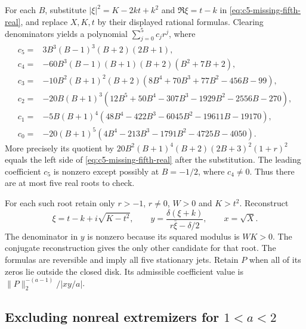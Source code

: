 \documentclass[11pt]{article}
\begin{document}
For each \(B\), substitute \(|\xi|^2=K-2kt+k^2\) and
\(\Re\xi=t-k\) in \eqref{eq:c5-missing-fifth-real}, and replace
\(X,K,t\) by their displayed rational formulas. Clearing
denominators yields a polynomial \(\sum_{j=0}^5 c_jr^j\),
where
\begin{align*}
 c_5={}&3B^3(B-1)^3(B+2)(2B+1),\\
 c_4={}&-60B^3(B-1)(B+1)(B+2)(B^2+7B+2),\\
 c_3={}&-10B^2(B+1)^2(B+2)(8B^4+70B^3+77B^2-456B-99),\\
 c_2={}&-20B(B+1)^3(12B^5+50B^4-307B^3-1929B^2-2556B-270),\\
 c_1={}&-5B(B+1)^4(48B^4-422B^3-6045B^2-19611B-19170),\\
 c_0={}&-20(B+1)^5(4B^4-213B^3-1791B^2-4725B-4050).
\end{align*}
More precisely its quotient by
\(20B^2(B+1)^4(B+2)(2B+3)^2(1+r)^2\) equals the left side of
\eqref{eq:c5-missing-fifth-real} after the substitution.
The leading coefficient \(c_5\) is nonzero except possibly
at \(B=-1/2\), where \(c_4\ne0\). Thus there are at most
five real roots to check.

For each such root retain only \(r>-1\), \(r\ne0\), \(W>0\)
and \(K>t^2\). Reconstruct
\[
 \xi=t-k+i\sqrt{K-t^2},\qquad
 y=\frac{\delta(\xi+k)}{r\bar\xi-\delta/2},\qquad x=\sqrt X.
\]
The denominator in \(y\) is nonzero because its squared modulus
is \(WK>0\). The conjugate reconstruction gives the only other
candidate for that root. The formulas are reversible and imply
all five stationary jets. Retain \(P\) when all of its zeros
lie outside the closed disk. Its admissible coefficient value is
\(\|P\|_2^{-(a-1)}/|xy/a|\).


\subsection{Excluding nonreal extremizers for \texorpdfstring{\(1<a<2\)}{1<a<2}}
\label{sec:low-hessian}
\end{document}
